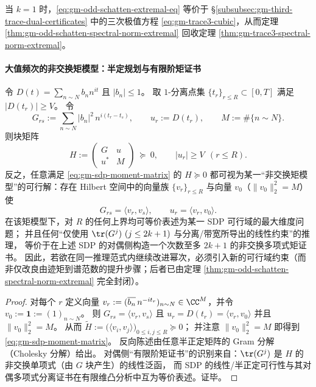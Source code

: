 \begin{remark}[与三阶迹极值律的一致性]
当 \(k=1\) 时，\eqref{eq:gm-odd-schatten-extremal-eq} 等价于 \S\ref{subsubsec:gm-third-trace-dual-certificates} 中的三次极值方程 \eqref{eq:gm-trace3-cubic}，从而定理 \ref{thm:gm-odd-schatten-spectral-norm-extremal} 回收定理 \ref{thm:gm-trace3-spectral-norm-extremal}。
\end{remark}

\paragraph{大值频次的非交换矩模型：半定规划与有限阶矩证书}
\begin{theorem}\label{thm:gm-large-values-sdp-moment-duality}
令 \(D(t)=\sum_{n\sim N} b_n n^{it}\) 且 \(|b_n|\le 1\)。
取 \(1\)-分离点集 \(\{t_r\}_{r\le R}\subset[0,T]\) 满足 \(|D(t_r)|\ge V\)。
令
\[
G_{rs}:=\sum_{n\sim N} |b_n|^2\,n^{i(t_r-t_s)},\qquad
u_r:=D(t_r),\qquad
M:=\#\{n\sim N\}.
\]
则块矩阵
\begin{equation}\label{eq:gm-sdp-moment-matrix}
H:=\begin{pmatrix}
G & u\\
u^\ast & M
\end{pmatrix}\ \succeq\ 0,
\qquad |u_r|\ge V\ \ (r\le R).
\end{equation}
反之，任意满足 \eqref{eq:gm-sdp-moment-matrix} 的 \(H\succeq 0\) 都可视为某一“非交换矩模型”的可行解：存在 Hilbert 空间中的向量族 \(\{v_r\}_{r\le R}\) 与向量 \(v_0\)（\(\|v_0\|_2^2=M\)）使
\[
G_{rs}=\langle v_r,v_s\rangle,\qquad u_r=\langle v_r,v_0\rangle.
\]
在该矩模型下，对 \(R\) 的任何上界均可等价表述为某一 SDP 可行域的最大维度问题；
并且任何“仅使用 \(\tr(G^j)\ (j\le 2k+1)\) 与分离/带宽所导出的线性约束”的推理，
等价于在上述 SDP 的对偶侧构造一个次数至多 \(2k+1\) 的非交换多项式矩证书。
因此，若欲在同一推理范式内继续改进幂次，必须引入新的可行域约束（而非仅改良由迹矩到谱范数的提升步骤；后者已由定理 \ref{thm:gm-odd-schatten-spectral-norm-extremal} 完全封闭）。
\end{theorem}

\begin{proof}
对每个 \(r\) 定义向量
\(
v_r:=(\overline{b_n}\,n^{-it_r})_{n\sim N}\in\CC^{M}
\)，并令 \(v_0:=\mathbf{1}:=(1)_{n\sim N}\)。
则
\(
G_{rs}=\langle v_r,v_s\rangle
\) 且
\(
u_r=D(t_r)=\langle v_r,v_0\rangle
\)
并且 \(\|v_0\|_2^2=M\)。
从而 \(\widetilde H:=\bigl(\langle v_i,v_j\rangle\bigr)_{0\le i,j\le R}\succeq 0\)；
并注意 \(\|v_0\|_2^2=M\) 即得到 \eqref{eq:gm-sdp-moment-matrix}。
反向陈述由任意半正定矩阵的 Gram 分解（Cholesky 分解）给出。
对偶侧“有限阶矩证书”的识别来自：\(\tr(G^j)\) 是 \(H\) 的非交换单项式（由 \(G\) 块产生）的线性泛函，
而 SDP 的线性/半正定可行性与其对偶多项式分离证书在有限维凸分析中互为等价表述。证毕。
\end{proof}

